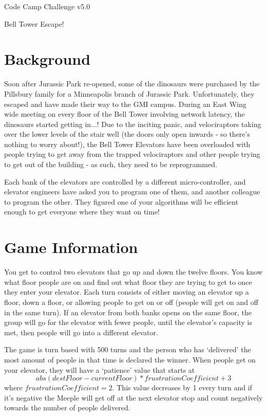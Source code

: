 \documentclass{article}
\begin{document}
\centerline{\sc \large Code Camp Challenge v5.0}
\vspace{.5pc}
\centerline{\sc Bell Tower Escape!}
\vspace{2pc}

\section*{Background}
Soon after Jurassic Park re-opened, some of the dinosaurs were purchased by the Pillsbury family for a Minneapolis branch of Jurassic Park. Unfortunately, they escaped and have made their way to the GMI campus. During an East Wing wide meeting on every floor of the Bell Tower involving network latency, the dinosaurs started getting in...! Due to the inciting panic, and velociraptors taking over the lower levels of the stair well (the doors only open inwards - so there's nothing to worry about!), the Bell Tower Elevators have been overloaded with people trying to get away from the trapped velociraptors and other people trying to get out of the building - as such, they need to be reprogrammed.

Each bank of the elevators are controlled by a different micro-controller, and elevator engineers have asked you to program one of them, and another colleague to program the other. They figured one of your algorithms will be efficient enough to get everyone where they want on time!

\section*{Game Information}
You get to control two elevators that go up and down the twelve floors. You know what floor people are on and find out what floor they are trying to get to once they enter your elevator. Each turn consists of either moving an elevator up a floor, down a floor, or allowing people to get on or off (people will get on and off in the same turn). If an elevator from both banks opens on the same floor, the group will go for the elevator with fewer people, until the elevator's capacity is met, then people will go into a different elevator.

The game is turn based with 500 turns and the person who has `delivered' the most amount of people in that time is declared the winner. When people get on your elevator, they will have a `patience' value that starts at $$abs(destFloor-currentFloor) * frustrationCoefficient + 3$$ where $frustrationCoefficient = 2$. This value decreases by 1 every turn and if it's negative the Meeple will get off at the next elevator stop and count negatively towards the number of people delivered.
\end{document}
